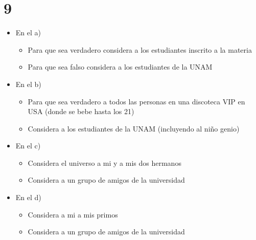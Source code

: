 \documentclass[12pt, fleqn]{article}                            %
\theoremstyle{break}                                            %
\begin{document}
\section{9}

    \begin{itemize}
        
        \item En el a) 
            \begin{itemize}
                \item 
                    Para que sea verdadero considera a los
                    estudiantes inscrito a la materia
                \item
                    Para que sea falso considera a los
                    estudiantes de la UNAM
            \end{itemize}

        \item En el b) 
            \begin{itemize}
                \item 
                    Para que sea verdadero a todos las
                    personas en una discoteca VIP en USA (donde
                    se bebe hasta los 21)
                \item
                    Considera a los estudiantes de la UNAM (incluyendo
                    al niño genio)
            \end{itemize}

        \item En el c) 
            \begin{itemize}
                \item 
                    Considera el universo a mi y a mis dos hermanos
                \item
                    Considera a un grupo de amigos de la universidad
            \end{itemize}

        \item En el d) 
            \begin{itemize}
                \item 
                    Considera a mi a mis primos
                \item
                    Considera a un grupo de amigos de la universidad
            \end{itemize}

    \end{itemize}
\end{document}
